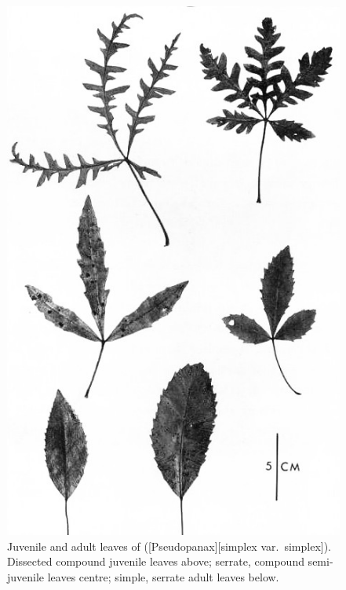 \begin{figure}[!t]
	\begin{minipage}[t]{\textwidth}
		\begin{minipage}[t]{(\textwidth-\fgap) * \real{0.524}}
			\centering
			\includegraphics[width=\textwidth]{graphics/fig_018}
			\caption[Juvenile and adult leaves of \emph{Pseudopanax simplex var.\ simplex}]{Juvenile and adult leaves of  ([Pseudopanax][simplex var.\ simplex]).
			Dissected compound juvenile leaves above; serrate, compound semi-juvenile leaves centre; simple, serrate adult leaves below.
}
\end{minipage}
\end{minipage}
\end{figure}
